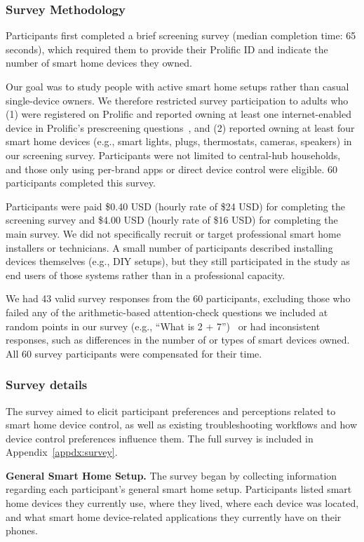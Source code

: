\subsubsection{Survey Methodology}
\label{cic:sec:survey_method}
Participants first completed a brief screening survey (median completion time: 65 seconds), which required them to provide their Prolific ID and indicate the number of smart home devices they owned.

{Our goal was to study people with active smart home setups rather than casual single-device owners. We therefore restricted survey participation to adults who (1) were registered on Prolific and reported owning at least one internet-enabled device in Prolific’s prescreening questions~\cite{peer2023platform}, and (2) reported owning at least four smart home devices (e.g., smart lights, plugs, thermostats, cameras, speakers) in our screening survey. Participants were not limited to central-hub households, and those only using per-brand apps or direct device control were eligible.} $60$ participants completed this survey. 

Participants were paid \$0.40 USD (hourly rate of \$24 USD) for completing the screening survey and \$4.00 USD (hourly rate of \$16 USD) for completing the main survey. {We did not specifically recruit or target professional smart home installers or technicians. A small number of participants described installing devices themselves (e.g., DIY setups), but they still participated in the study as end users of those systems rather than in a professional capacity.}

We had 43 valid survey responses from the 60 participants, excluding those who failed any of the arithmetic-based attention-check questions we included at random points in our survey (e.g., ``What is 2 + 7'')~\cite{abbey2017attention} or had inconsistent responses, such as differences in the number of or types of smart devices owned. All 60 survey participants were compensated for their time.

\subsubsection{Survey details}
The survey aimed to elicit participant preferences and perceptions related to smart home device control, as well as existing troubleshooting workflows and how device control preferences influence them. 
The full survey is included in Appendix~\ref{appdx:survey}.

\noindent\textbf{General Smart Home Setup.}
The survey began by collecting information regarding each participant's general smart home setup. Participants listed smart home devices they currently use, where they lived, where each device was located, and what smart home device-related applications they currently have on their phones. 


